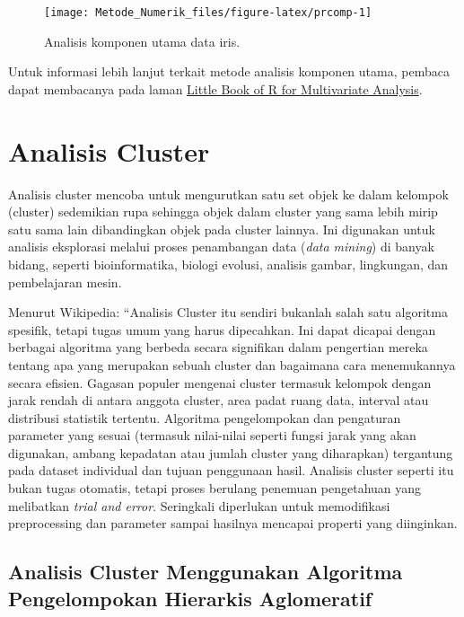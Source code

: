 \documentclass[]{book}
\theoremstyle{definition}
\theoremstyle{definition}
\theoremstyle{definition}
\theoremstyle{remark}
\begin{document}
\begin{figure}

{\centering \texttt{[image: Metode\_Numerik\_files/figure-latex/prcomp-1]} 

}

\caption{Analisis komponen utama data iris.}\label{fig:prcomp}
\end{figure}

Untuk informasi lebih lanjut terkait metode analisis komponen utama, pembaca dapat membacanya pada laman \href{https://little-book-of-r-for-multivariate-analysis.readthedocs.io/en/latest/}{Little Book of R for Multivariate Analysis}.

\hypertarget{analisis-cluster}{%
\section{Analisis Cluster}\label{analisis-cluster}}

Analisis cluster mencoba untuk mengurutkan satu set objek ke dalam kelompok (cluster) sedemikian rupa sehingga objek dalam cluster yang sama lebih mirip satu sama lain dibandingkan objek pada cluster lainnya. Ini digunakan untuk analisis eksplorasi melalui proses penambangan data (\emph{data mining}) di banyak bidang, seperti bioinformatika, biologi evolusi, analisis gambar, lingkungan, dan pembelajaran mesin.

Menurut Wikipedia: ``Analisis Cluster itu sendiri bukanlah salah satu algoritma spesifik, tetapi tugas umum yang harus dipecahkan. Ini dapat dicapai dengan berbagai algoritma yang berbeda secara signifikan dalam pengertian mereka tentang apa yang merupakan sebuah cluster dan bagaimana cara menemukannya secara efisien. Gagasan populer mengenai cluster termasuk kelompok dengan jarak rendah di antara anggota cluster, area padat ruang data, interval atau distribusi statistik tertentu. Algoritma pengelompokan dan pengaturan parameter yang sesuai (termasuk nilai-nilai seperti fungsi jarak yang akan digunakan, ambang kepadatan atau jumlah cluster yang diharapkan) tergantung pada dataset individual dan tujuan penggunaan hasil. Analisis cluster seperti itu bukan tugas otomatis, tetapi proses berulang penemuan pengetahuan yang melibatkan \emph{trial and error}. Seringkali diperlukan untuk memodifikasi preprocessing dan parameter sampai hasilnya mencapai properti yang diinginkan.

\hypertarget{analisis-cluster-menggunakan-algoritma-pengelompokan-hierarkis-aglomeratif}{%
\subsection{Analisis Cluster Menggunakan Algoritma Pengelompokan Hierarkis Aglomeratif}\label{analisis-cluster-menggunakan-algoritma-pengelompokan-hierarkis-aglomeratif}}
\end{document}
